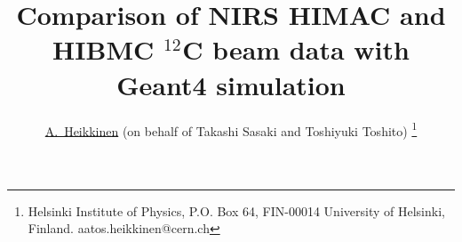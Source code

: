 \newcommand{\todo}[1]{{\bf TODO} #1}
\newif\ifPAPER  
\PAPERfalse  

\def\t{\title{Comparison of NIRS HIMAC and HIBMC $^{12}$C beam data with Geant4 simulation} }

\def\a{
\author{A.~Heikkinen} 
\affiliation{Helsinki Institute of Physics, P.O. Box 64, FIN-00014 University of Helsinki (Finland)}
}

\newcommand{\codeAlgorithm}[1]{
\addcontentsline{toc}{section}{Résumé}
\begin{center}\fbox{\parbox{12cm}{\bf #1}}\end{center}}

\newcommand{\cppintro}[1]{
\lstset{language=C,
caption= #1 ,
label=listing:boundary}}

\def\cppstart{\begin{lstlisting}}
\def\cppend{\end{lstlisting}}

\newif\ifCITENOTE 
\CITENOTEtrue

\ifPAPER

\else   %

\documentclass[slidestop,compress,xdvips,10pt]{beamer} 
\usepackage{graphicx}
\usepackage{hyperref}
\usepackage{listings}
\usepackage{verbatim} %
\transglitter[direction=315]
\usepackage{color} %
\usepackage{attachfile} 


\makeatother
\beamertemplatetransparentcoveredhigh
\t
\author{\underline{A.~Heikkinen} (on behalf of Takashi Sasaki and Toshiyuki Toshito)
\footnote{Helsinki Institute of Physics, P.O. Box 64, FIN-00014 University of Helsinki, Finland.
aatos.heikkinen@cern.ch}}

